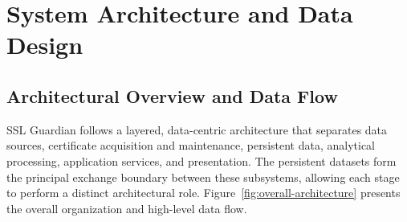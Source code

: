 
\chapter{System Architecture and Data Design}
\label{chap:architecture-data-design}

\section{Architectural Overview and Data Flow}
\label{sec:architectural-overview}

SSL Guardian follows a layered, data-centric architecture that separates data
sources, certificate acquisition and maintenance, persistent data, analytical
processing, application services, and presentation. The persistent datasets
form the principal exchange boundary between these subsystems, allowing each
stage to perform a distinct architectural role. Figure~\ref{fig:overall-architecture}
presents the overall organization and high-level data flow.

